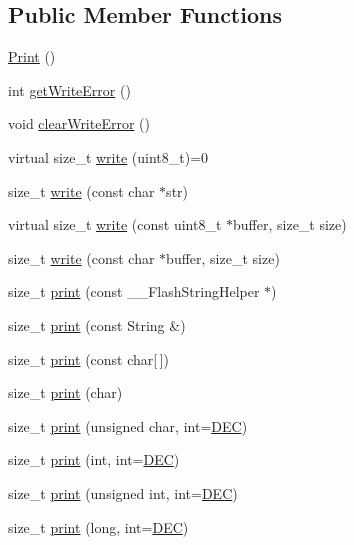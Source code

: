 \subsection*{Public Member Functions}
\begin{DoxyCompactItemize}
\item 
\hyperlink{class_print_aacaf064c16179a713ca892501f767628}{Print} ()
\item 
int \hyperlink{class_print_a207358e5283fd1720a123ed58ec79196}{get\+Write\+Error} ()
\item 
void \hyperlink{class_print_af50f0c1e1c726ef3dee08a84456090b9}{clear\+Write\+Error} ()
\item 
virtual size\+\_\+t \hyperlink{class_print_acde4db2f92186810af3493fd2c7535f0}{write} (uint8\+\_\+t)=0
\item 
size\+\_\+t \hyperlink{class_print_add50e5436017b9c2f1e0d11c9476bf1b}{write} (const char $\ast$str)
\item 
virtual size\+\_\+t \hyperlink{class_print_a7c66fc8d559f4956d4ccea196299bca7}{write} (const uint8\+\_\+t $\ast$buffer, size\+\_\+t size)
\item 
size\+\_\+t \hyperlink{class_print_ab81a6ce741d7baea3821248649bdeaca}{write} (const char $\ast$buffer, size\+\_\+t size)
\item 
size\+\_\+t \hyperlink{class_print_a443a13ae44e1a8930db53fc5161554f9}{print} (const \+\_\+\+\_\+\+Flash\+String\+Helper $\ast$)
\item 
size\+\_\+t \hyperlink{class_print_a2e9a01ff871af146cfbf2f321e60853f}{print} (const String \&)
\item 
size\+\_\+t \hyperlink{class_print_aae81a9f0e10656d079c8ee3d871f95dd}{print} (const char\mbox{[}$\,$\mbox{]})
\item 
size\+\_\+t \hyperlink{class_print_abd72fb37c98f21760aa7882cb34bf86b}{print} (char)
\item 
size\+\_\+t \hyperlink{class_print_a24bf7a9a27ae741994b38fbf45927a38}{print} (unsigned char, int=\hyperlink{_print_8h_afe38ec6126e35e40049e27fdf4586ba5}{D\+E\+C})
\item 
size\+\_\+t \hyperlink{class_print_ad485be2c2a9bd124789a58e41533bec3}{print} (int, int=\hyperlink{_print_8h_afe38ec6126e35e40049e27fdf4586ba5}{D\+E\+C})
\item 
size\+\_\+t \hyperlink{class_print_a5162c987fb51e1f223b92af3ed436d9c}{print} (unsigned int, int=\hyperlink{_print_8h_afe38ec6126e35e40049e27fdf4586ba5}{D\+E\+C})
\item 
size\+\_\+t \hyperlink{class_print_a447df1d390c7dc8af70f7e684963b212}{print} (long, int=\hyperlink{_print_8h_afe38ec6126e35e40049e27fdf4586ba5}{D\+E\+C})

\end{DoxyCompactItemize}
